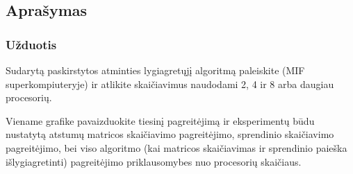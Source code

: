 \documentclass[a4paper,10pt]{article}
\begin{document}
\subsection{Aprašymas}
\subsubsection{Užduotis}
Sudarytą paskirstytos atminties lygiagretųjį algoritmą paleiskite (MIF superkompiuteryje) ir atlikite skaičiavimus naudodami 2, 4 ir 8 arba daugiau procesorių.

Viename grafike pavaizduokite tiesinį pagreitėjimą ir eksperimentų būdu nustatytą atstumų matricos skaičiavimo pagreitėjimo, sprendinio skaičiavimo pagreitėjimo, bei viso algoritmo (kai matricos skaičiavimas ir sprendinio paieška išlygiagretinti) pagreitėjimo priklausomybes nuo procesorių skaičiaus.
\newpage
\end{document}
